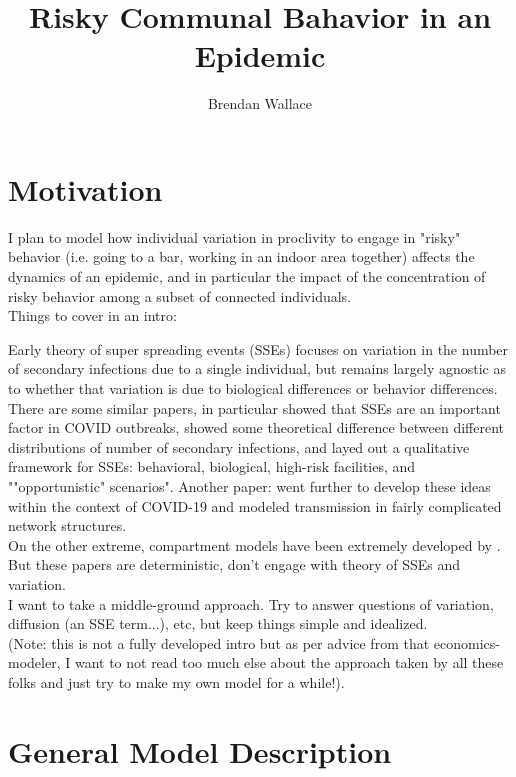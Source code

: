 \documentclass{article}
\title{Risky Communal Bahavior in an Epidemic}
\author{Brendan Wallace}
\begin{document}
\maketitle


\section{Motivation}
I plan to model how individual variation in proclivity to engage in "risky"
behavior (i.e. going to a bar, working in an indoor area together) affects the dynamics of an epidemic, and in particular the impact of the concentration of
risky behavior among a subset of connected individuals.\\

Things to cover in an intro:

Early theory of super spreading events (SSEs)
focuses on variation in the number of secondary infections due to a single
individual, but remains largely agnostic as to whether that variation is due to biological differences or behavior differences.\cite{SSEs2005}\\

There are some similar papers, in particular \cite{laurant} showed that SSEs are an important factor in COVID outbreaks, showed some theoretical difference between
different distributions of number of secondary infections, and layed out a
qualitative framework for SSEs: behavioral, biological, high-risk facilities, and
""opportunistic" scenarios".
Another paper: \cite{gross} went further to develop these ideas
within the context of COVID-19 and modeled transmission in fairly complicated
network structures.\\

On the other extreme, compartment models have been extremely developed
by \cite{1980s}.  But these papers are deterministic,
don't engage with theory of SSEs and variation.\\

I want to take a middle-ground approach.  Try to answer questions of
variation, diffusion (an SSE term...), etc, but keep things simple and idealized.\\

(Note: this is not a fully developed intro but as per advice from that economics-modeler, I want to not read too much
else about the approach taken by all these folks and just try to make my own
model for a while!).


\section{General Model Description}
\end{document}

